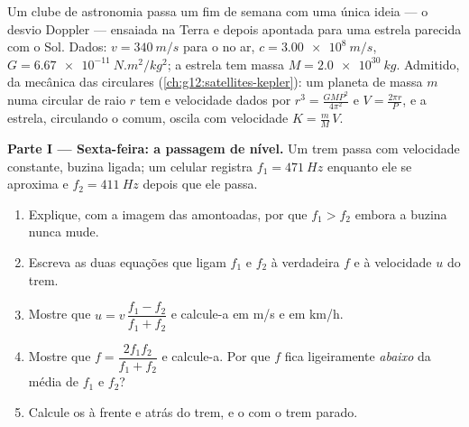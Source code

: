 \begin{problem}
\label{pb:g12:doppler-effect:1}
Um clube de astronomia passa um fim de semana com uma única ideia --- o
desvio Doppler --- ensaiada na Terra e depois apontada para uma estrela
parecida com o Sol. Dados: $v = \qty{340}{m/s}$ para o  no ar,
$c = \qty{3.00e8}{m/s}$, $G = \qty{6.67e-11}{N.m^2/kg^2}$; a estrela tem
massa $M = \qty{2.0e30}{kg}$. Admitido, da mecânica das 
circulares (\cref{ch:g12:satellites-kepler}): um planeta de massa $m$
numa  circular de raio $r$ tem  e velocidade dados por
$r^3 = \frac{G M P^2}{4\pi^2}$ e $V = \frac{2\pi r}{P}$, e a estrela,
circulando o  comum, oscila com velocidade
$K = \frac{m}{M}\,V$.

\medskip
\noindent\textbf{Parte I --- Sexta-feira: a passagem de nível.}
Um trem passa com velocidade constante, buzina ligada; um celular
registra $f_1 = \qty{471}{Hz}$ enquanto ele se aproxima e
$f_2 = \qty{411}{Hz}$ depois que ele passa.
\begin{enumerate}
  \item Explique, com a imagem das  amontoadas, por que
        $f_1 > f_2$ embora a buzina nunca mude.
  \item Escreva as duas equações que ligam $f_1$ e $f_2$ à 
        verdadeira $f$ e à velocidade $u$ do trem.
  \item Mostre que $u = v\,\dfrac{f_1 - f_2}{f_1 + f_2}$ e calcule-a em
        \unit{m/s} e em \unit{km/h}.
  \item Mostre que $f = \dfrac{2 f_1 f_2}{f_1 + f_2}$ e calcule-a. Por
        que $f$ fica ligeiramente \emph{abaixo} da média de $f_1$ e
        $f_2$?
  \item Calcule os  à frente e atrás do trem, e o
         com o trem parado.
\end{enumerate}


\end{problem}
